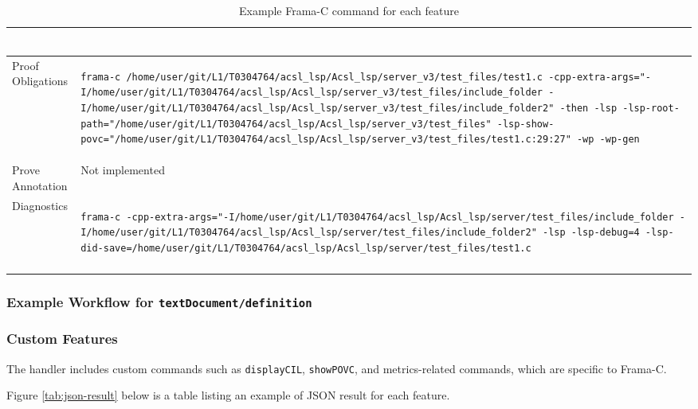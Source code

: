 \documentclass[10pt]{article}
\begin{document}
\begin{singlespace}
\begin{longtable}[H]{|l|p{10cm}|}
\begin{lstlisting}
\end{lstlisting} \\ \hline
		Proof Obligations 			& 
\begin{lstlisting}
frama-c /home/user/git/L1/T0304764/acsl_lsp/Acsl_lsp/server_v3/test_files/test1.c -cpp-extra-args="-I/home/user/git/L1/T0304764/acsl_lsp/Acsl_lsp/server_v3/test_files/include_folder -I/home/user/git/L1/T0304764/acsl_lsp/Acsl_lsp/server_v3/test_files/include_folder2" -then -lsp -lsp-root-path="/home/user/git/L1/T0304764/acsl_lsp/Acsl_lsp/server_v3/test_files" -lsp-show-povc="/home/user/git/L1/T0304764/acsl_lsp/Acsl_lsp/server_v3/test_files/test1.c:29:27" -wp -wp-gen 
\end{lstlisting} \\ \hline
		Prove Annotation 			& Not implemented \\ \hline
		Diagnostics 				& 
\begin{lstlisting}
frama-c -cpp-extra-args="-I/home/user/git/L1/T0304764/acsl_lsp/Acsl_lsp/server/test_files/include_folder -I/home/user/git/L1/T0304764/acsl_lsp/Acsl_lsp/server/test_files/include_folder2" -lsp -lsp-debug=4 -lsp-did-save=/home/user/git/L1/T0304764/acsl_lsp/Acsl_lsp/server/test_files/test1.c 
\end{lstlisting} \\ \hline
	\caption{Example Frama-C command for each feature}
    \label{tab:frama-c-command}
\end{longtable}

\subsubsection{Example Workflow for \texttt{textDocument/definition}}

\subsubsection{Custom Features}

The handler includes custom commands such as \texttt{displayCIL}, \texttt{showPOVC}, and metrics-related commands, which are specific to Frama-C. 

Figure \ref{tab:json-result} below is a table listing an example of JSON result for each feature.


\end{singlespace}
\end{document}

